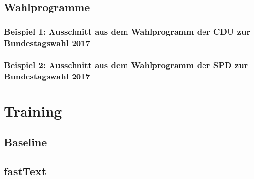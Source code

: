 \pagebreak

\subsection*{Wahlprogramme} \label{subsec:overviewWP}

\subsubsection*{Beispiel 1: Ausschnitt aus dem Wahlprogramm der CDU zur Bundestagswahl 2017}


\subsubsection*{Beispiel 2: Ausschnitt aus dem Wahlprogramm der SPD zur Bundestagswahl 2017}


\pagebreak

\section{Training} \label{ch:trainingAppendix}

\subsection*{Baseline}


\subsection*{fastText}

